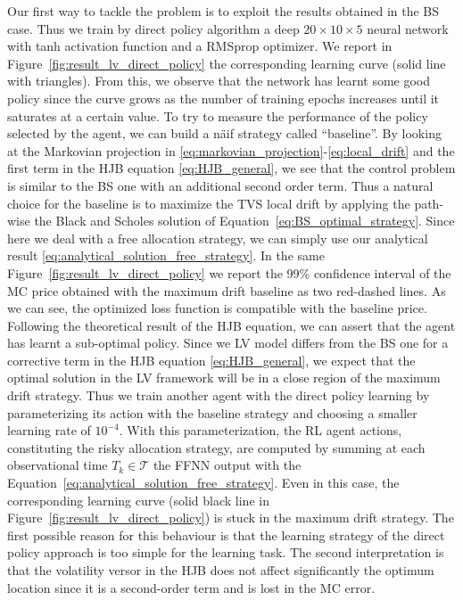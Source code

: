 \documentclass[runningheads]{m2ef}
\newcommand{\quotations}[1]{``#1''}
\begin{document}
	Our first way to tackle the problem is to exploit the results obtained in the BS case. Thus we train by direct policy algorithm a deep $20\times 10\times 5$ neural network with tanh activation function and a RMSprop optimizer. We report in Figure~\ref{fig:result_lv_direct_policy} the corresponding learning curve (solid line with triangles). From this, we observe that the network has learnt some good policy since the curve grows as the number of training epochs increases until it saturates at a certain value. To try to measure the performance of the policy selected by the agent, we can build a n\"aif strategy called \quotations{baseline}. By looking at the Markovian projection in \eqref{eq:markovian_projection}-\eqref{eq:local_drift} and the first term in the HJB equation \eqref{eq:HJB_general}, we see that the control problem is similar to the BS one with an additional second order term. Thus a natural choice for the baseline is to maximize the TVS local drift by applying the path-wise the Black and Scholes solution of Equation~\eqref{eq:BS_optimal_strategy}. Since here we deal with a free allocation strategy, we can simply use our analytical result \eqref{eq:analytical_solution_free_strategy}. In the same Figure~\ref{fig:result_lv_direct_policy} we report the 99\% confidence interval of the MC price obtained with the maximum drift baseline as two red-dashed lines. As we can see, the optimized loss function is compatible with the baseline price. Following the theoretical result of the HJB equation, we can assert that the agent has learnt a sub-optimal policy. Since we LV model differs from the BS one for a corrective term in the HJB equation \eqref{eq:HJB_general}, we expect that the optimal solution  in the LV framework will be in a close region of the maximum drift strategy. Thus we train another agent with the direct policy learning by parameterizing its action with the baseline strategy and choosing a smaller learning rate of $10^{-4}$. With this parameterization, the RL agent actions, constituting the risky allocation strategy, are computed by summing at each observational time $T_k\in\mathcal{T}$ the FFNN output with the Equation~\eqref{eq:analytical_solution_free_strategy}. Even in this case, the corresponding learning curve (solid black line in Figure~\ref{fig:result_lv_direct_policy}) is stuck in the maximum drift strategy. The first possible reason for this behaviour is that the learning strategy of the direct policy approach is too simple for the learning task. The second interpretation is that the volatility versor in the HJB does not affect significantly the optimum location since it is a second-order term and is lost in the MC error. 
\end{document}
